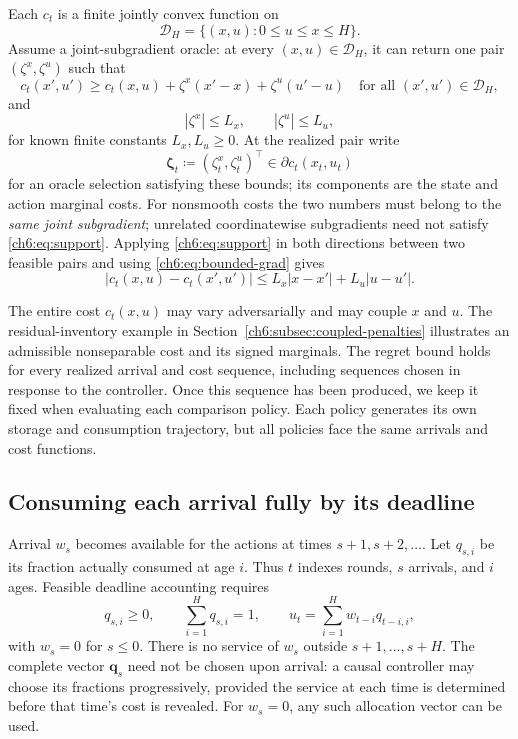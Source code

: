 \documentclass[11pt]{article}
\theoremstyle{plain}
\theoremstyle{remark}
\numberwithin{equation}{section}
\begin{document}
Each $c_t$ is a finite jointly convex function on
\begin{equation}\label{ch6:eq:domain}
 \mathcal{D}_H=\{(x,u):0\le u\le x\le H\}.
\end{equation}
Assume a joint-subgradient oracle: at every $(x,u)\in\mathcal{D}_H$, it can return
one pair $(\zeta^x,\zeta^u)$ such that
\begin{equation}\label{ch6:eq:support}
 c_t(x',u')\ge c_t(x,u)+\zeta^x(x'-x)+\zeta^u(u'-u)
 \quad\text{for all }(x',u')\in\mathcal{D}_H,
\end{equation}
and
\begin{equation}\label{ch6:eq:bounded-grad}
 |\zeta^x|\le L_x,\qquad |\zeta^u|\le L_u,
\end{equation}
for known finite constants $L_x,L_u\ge0$.
At the realized pair write
\begin{equation}\label{ch6:eq:actual-grad}
 \boldsymbol{\zeta}_t\coloneqq(\zeta_t^x,\zeta_t^u)^\top
 \in\partial c_t(x_t,u_t)
\end{equation}
for an oracle selection satisfying these bounds; its components are the state and action marginal costs.
For nonsmooth costs the two numbers must belong to the \emph{same joint
subgradient}; unrelated coordinatewise subgradients need not satisfy
\eqref{ch6:eq:support}.
Applying \eqref{ch6:eq:support} in both directions between two feasible
pairs and using \eqref{ch6:eq:bounded-grad} gives
\begin{equation}\label{ch6:eq:lipschitz}
 |c_t(x,u)-c_t(x',u')|\le L_x|x-x'|+L_u|u-u'|.
\end{equation}

The entire cost $c_t(x,u)$ may vary adversarially and may couple $x$ and $u$.
The residual-inventory example in
Section~\ref{ch6:subsec:coupled-penalties} illustrates an admissible
nonseparable cost and its signed marginals.
The regret bound holds for every realized arrival and cost sequence,
including sequences chosen in response to the controller. Once this
sequence has been produced, we keep it fixed when evaluating each
comparison policy. Each policy generates its own storage and consumption
trajectory, but all policies face the same arrivals and cost functions.

\subsection{Consuming each arrival fully by its deadline}
Arrival $w_s$ becomes available for the actions at times $s+1,s+2,\ldots$.
Let $q_{s,i}$ be its fraction actually consumed at age $i$. Thus $t$ indexes
rounds, $s$ arrivals, and $i$ ages. Feasible deadline accounting requires
\begin{equation}\label{ch6:eq:deadline}
 q_{s,i}\ge0,\qquad \sum_{i=1}^Hq_{s,i}=1,\qquad
 u_t=\sum_{i=1}^H w_{t-i}q_{t-i,i},
\end{equation}
with $w_s=0$ for $s\le0$. There is no service of $w_s$ outside
$s+1,\ldots,s+H$. The complete vector $\mathbf q_s$ need not be chosen upon arrival:
a causal controller may choose its fractions progressively, provided the
service at each time is determined before that time's cost is revealed.
For $w_s=0$, any such allocation vector can be used.
\end{document}
